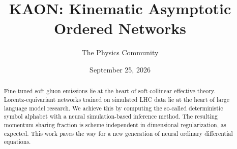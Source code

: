 \documentclass[11pt]{article}
\title{KAON: Kinematic Asymptotic Ordered Networks}
\author{The Physics Community}
\date{September 25, 2026}
\numberwithin{equation}{section}
\theoremstyle{definition}
\theoremstyle{remark}
\begin{document}
\maketitle
\begin{abstract}
Fine-tuned soft gluon emissions lie at the heart of soft-collinear
effective theory. Lorentz-equivariant networks trained on simulated LHC
data lie at the heart of large language model research. We achieve this
by computing the so-called deterministic symbol alphabet with a neural
simulation-based inference method. The resulting momentum sharing
fraction is scheme independent in dimensional regularization, as
expected. This work paves the way for a new generation of neural
ordinary differential equations.
\end{abstract}
\tableofcontents





\nocite{*}


\end{document}

